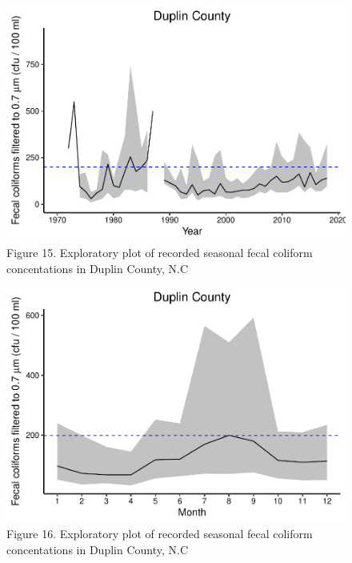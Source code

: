 \documentclass[12pt,]{article}
\begin{document}
\begin{figure}
\centering
\includegraphics{Edmondson_ENV872_Project_files/figure-latex/unnamed-chunk-14-1.pdf}
\caption{Figure 15. Exploratory plot of recorded seasonal fecal coliform
concentations in Duplin County, N.C}
\end{figure}

\begin{figure}
\centering
\includegraphics{Edmondson_ENV872_Project_files/figure-latex/unnamed-chunk-15-1.pdf}
\caption{Figure 16. Exploratory plot of recorded seasonal fecal coliform
concentations in Duplin County, N.C}
\end{figure}
\end{document}
